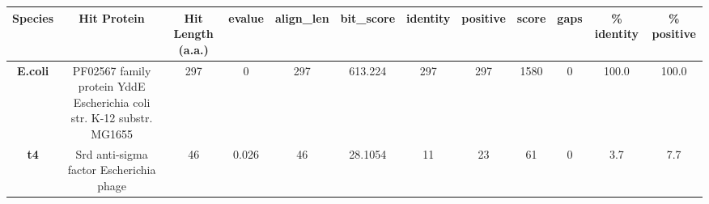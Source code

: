 \begin{tabular}{|c|c|c|c|c|c|c|c|c|c|c|c|} \hline
\textbf{Species} & \textbf{Hit Protein} & \textbf{Hit Length (a.a.)} & \textbf{evalue} & \textbf{align\_len} & \textbf{bit\_score} & \textbf{identity} & \textbf{positive} & \textbf{score} & \textbf{gaps} & \textbf{\% identity} & \textbf{\% positive} \\ \hline
\textbf{E.coli} & PF02567 family protein YddE Escherichia coli str. K-12 substr. MG1655 & 297 & 0 & 297 & 613.224 & 297 & 297 & 1580 & 0 & 100.0 & 100.0\\
\textbf{t4} & Srd anti-sigma factor Escherichia phage  & 46 & 0.026 & 46 & 28.1054 & 11 & 23 & 61 & 0 & 3.7 & 7.7\\
\hline \end{tabular}
